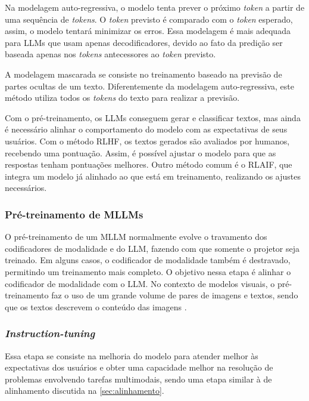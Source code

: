 Na modelagem auto-regressiva, o modelo tenta prever o próximo \textit{token} a partir de uma sequência de
\textit{tokens}. O \textit{token} previsto é comparado com o \textit{token} esperado, assim, o modelo tentará minimizar
os erros. Essa modelagem é mais adequada para \acp{LLM} que usam apenas decodificadores, devido ao fato da predição ser
baseada apenas nos \textit{tokens} antecessores ao \textit{token} previsto.

A modelagem mascarada se consiste no treinamento baseado na previsão de partes ocultas de um texto. Diferentemente da
modelagem auto-regressiva, este método utiliza todos os \textit{tokens} do texto para realizar a previsão.

 \label{sec:alinhamento}

Com o pré-treinamento, os \acp{LLM} conseguem gerar e classificar textos, mas ainda é necessário alinhar o
comportamento do modelo com as expectativas de seus usuários. Com o método \ac{RLHF}, os textos gerados são avaliados
por humanos, recebendo uma pontuação. Assim, é possível ajustar o modelo para que as respostas tenham pontuações
melhores. Outro método comum é o \ac{RLAIF}, que integra um modelo já alinhado ao que está em treinamento, realizando
os ajustes necessários.

\subsubsection{Pré-treinamento de MLLMs}

O pré-treinamento de um \ac{MLLM} normalmente evolve o travamento dos codificadores de modalidade e do \ac{LLM},
fazendo com que somente o projetor seja treinado. Em alguns casos, o codificador de modalidade também é destravado,
permitindo um treinamento mais completo. O objetivo nessa etapa é alinhar o codificador de modalidade com o \ac{LLM}.
No contexto de modelos visuais, o pré-treinamento faz o uso de um grande volume de pares de imagens e textos, sendo que
os textos descrevem o conteúdo das imagens \cite{mllm_survey_2023}.

\subsubsection{\textit{Instruction-tuning}}

Essa etapa se consiste na melhoria do modelo para atender melhor às expectativas dos usuários e obter uma capacidade
melhor na resolução de problemas envolvendo tarefas multimodais, sendo uma etapa similar à de alinhamento discutida na
\autoref{sec:alinhamento}.

